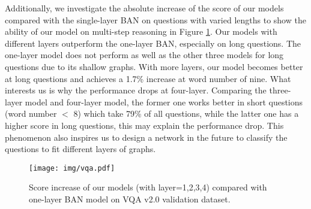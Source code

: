 \documentclass[10pt,twocolumn,letterpaper]{article}
\begin{document}
\begin{table}
	\centering
\vspace{3pt}
\caption{Score on VQA v2.0 validation dataset. $\times L$ denotes stacking $L$ layers of the proposed model. V-graph is short for image-graph, Q-graph for question-graph, BGNs for (V-graph + Q-graph), and SDP for scaled dot-product.}
\label{table:vqa_model2}
\vspace{-5pt}
\end{table}

Additionally, we investigate the absolute increase of the score of our models compared with the single-layer BAN on questions with varied lengths to show the ability of our model on multi-step reasoning in Figure \ref{fig:vqa}. Our models with different layers outperform the one-layer BAN, especially on long questions. The one-layer model does not perform as well as the other three models for long questions due to its shallow graphs. With more layers, our model becomes better at long questions and achieves a 1.7\% increase at word number of nine. What interests us is why the performance drops at four-layer. Comparing the three-layer model and four-layer model, the former one works better in short questions (word number $<$ 8) which take 79\% of all questions, while the latter one has a higher score in long questions, this may explain the performance drop. This phenomenon also inspires us to design a network in the future to classify the questions to fit different layers of graphs.
\begin{figure}
	\centering
	\texttt{[image: img/vqa.pdf]}
	\caption{Score increase of our models (with layer=1,2,3,4) compared with one-layer BAN model on VQA v2.0 validation dataset.}
	\label{fig:vqa}
	\vspace{-5pt}
\end{figure}
\end{document}
